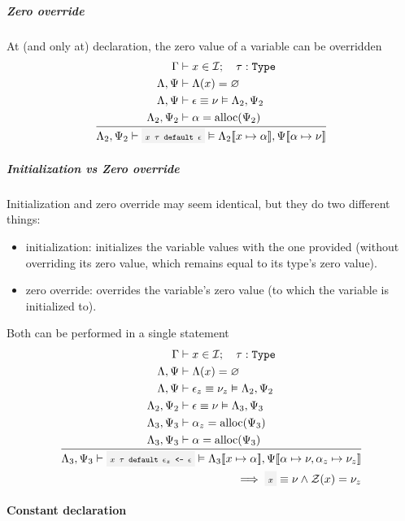 \subparagraph{Zero override} At (and only at) declaration, the zero value of a
variable can be overridden
\[
	\oprule[aligned]{
		\EnvSym               &\then x \in \Id \semiq \tau : \Type \\*
		\EnvLoc,\EnvStore     &\then \EnvLoc(x) = \varnothing \\*
		\EnvLoc,\EnvStore     &\then \expr \eval \val \Then \EnvLoc_2,\EnvStore_2 \\*
		\EnvLoc_2,\EnvStore_2 &\then \addr = \alloc(\EnvStore_2) \\*
	}{
		\EnvLoc_2,\EnvStore_2 \then \code{$x$ $\tau$ default $\expr$}
		\Then \EnvLoc_2\env{x \mapsto \addr},\EnvStore\env{\addr \mapsto \val}
	}
\]

\subparagraph{Initialization vs Zero override} Initialization and zero
override may seem identical, but they do two different things:
\begin{itemize}
	\item initialization: initializes the variable values with the one provided
		(without overriding its zero value, which remains equal to its type's
		zero value).
	\item zero override: overrides the variable's zero value (to which the
		variable is initialized to).
\end{itemize}
Both can be performed in a single statement
\[
	\oprule[aligned]{
		\EnvSym               &\then x \in \Id \semiq \tau : \Type \\*
		\EnvLoc,\EnvStore     &\then \EnvLoc(x) = \varnothing \\*
		\EnvLoc,\EnvStore     &\then \expr_z \eval \val_z \Then \EnvLoc_2,\EnvStore_2 \\*
		\EnvLoc_2,\EnvStore_2 &\then \expr \eval \val \Then \EnvLoc_3,\EnvStore_3 \\*
		\EnvLoc_3,\EnvStore_3 &\then \addr_z = \alloc(\EnvStore_3) \\*
		\EnvLoc_3,\EnvStore_3 &\then \addr = \alloc(\EnvStore_3) \\*
	}{
		\EnvLoc_3,\EnvStore_3 \then \code{$x$ $\tau$ default $\expr_z$ <- $\expr$}
		\Then \EnvLoc_3\env{x \mapsto \addr},\EnvStore\env{\addr \mapsto \val,\addr_z \mapsto \val_z} \\*
		\hfill\implies \code{$x$} \eval \val \land \Zero(x) = \val_z
	}
\]

\paragraph{Constant declaration}

